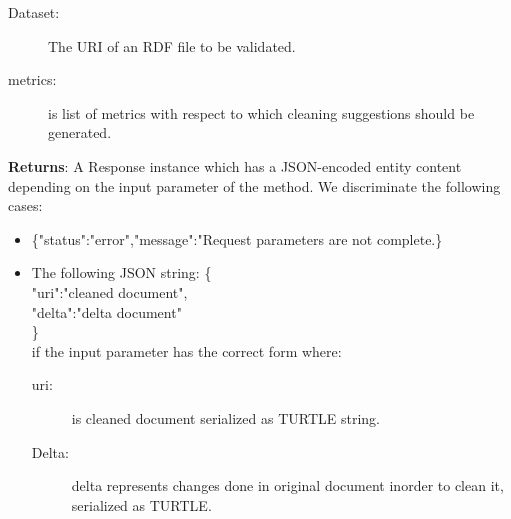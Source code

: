 \begin{description}
\begin{itemize}
\begin{description}
\item[Dataset:] The URI of an RDF file to be validated. 
\item[metrics:]  is list of metrics with respect to which cleaning suggestions should be 		generated.
\end{description}
\end{itemize}
\textbf{Returns}: A Response instance which has a JSON-encoded entity content depending on the input parameter of the method. We discriminate the following cases: 
\begin{itemize}
\item  \{"status":"error","message":"Request parameters are not complete.\}
\item The following JSON string:
\{ \\
\hspace*{0.5 cm}"uri":"cleaned document", \\
\hspace*{0.5 cm}"delta":"delta document" \\ 
\} \\
if the input parameter has the correct form where:
\begin{description}
\item [uri:] is cleaned document serialized as TURTLE string.
\item [Delta:] delta represents changes done in original document inorder to clean it, serialized as 	TURTLE.
\end{description} 
\end{itemize}

\end{description}






\

